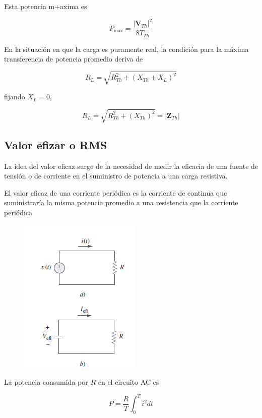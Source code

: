 Esta potencia m+axima es 

\begin{equation*}
P_{\text{max}} = \frac{|\mathbf{V}_{Th}|^2}{8 T_{Th}}
\end{equation*}

En la situación en que la carga es puramente real, la condición para la máxima transferencia de potencia promedio deriva de 

\begin{equation*}
R_L = \sqrt{R_{Th}^2 + (X_{Th} + X_L)^2}
\end{equation*}

fijando $X_L=0$,

\begin{equation*}
R_L = \sqrt{R_{Th}^2 + (X_{Th})^2} = |\mathbf{Z}_{Th}|
\end{equation*}

\subsection{Valor efizar o RMS}

La idea del valor eficaz surge de la necesidad de medir la eficacia de una fuente de tensión o de corriente en el suministro de potencia a una carga resistiva.

El valor eficaz de una corriente periódica es la corriente de continua que suministraría la misma potencia promedio a una resistencia que la corriente periódica

\begin{figure}[H]
    \centering
    \includegraphics{Elect_circ/pot_f2.png}
\end{figure}

La potencia consumida por $R$ en el circuito AC es

\begin{equation*}
P=\frac{R}{T}\int_{0}^T i^2 dt
\end{equation*}

